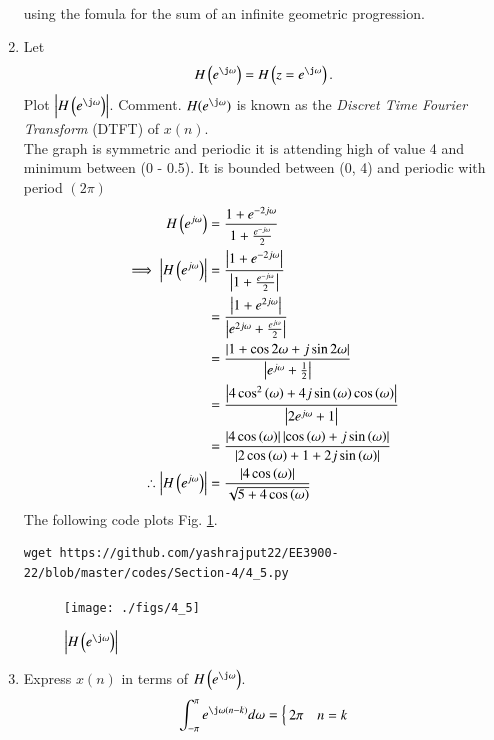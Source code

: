 \begin{enumerate}[label=\thesection.\arabic*]
\begin{align}
\end{align}
using the fomula for the sum of an infinite geometric progression.
%
\item 
Let
\begin{equation}
H\brak{e^{\j \omega}} = H\brak{z = e^{\j \omega}}.
\end{equation}
Plot $\abs{H\brak{e^{\j \omega}}}$.  Comment.  $H(e^{\j \omega})$ is
known as the {\em Discret Time Fourier Transform} (DTFT) of $x(n)$.
\\
\solution  The graph is symmetric and periodic it is attending high of value 4 and minimum between (0 - 0.5). 
It is bounded between (0, 4) and periodic with period $(2\pi)$
\\
\begin{align}
	H\left(e^{j \omega}\right) &= \frac{1+e^{-2j\omega}}{1 + \frac{e^{-j\omega}}{2}}\\
	  \implies \left\vert H\left(e^{j \omega}\right)\right\vert &= \frac{\left\vert1+e^{-2j\omega}\right\vert}{\left\vert1 + \frac{e^{-j\omega}}{2}\right\vert}\\
						  &= \frac{\left\vert1+e^{2j\omega}\right\vert}{\left\vert e^{2j\omega} + \frac{e^{j\omega}}{2}\right\vert}\\
						  &= \frac{\left\vert1+\cos2\omega + j\sin2\omega\right\vert}{\left\vert e^{j\omega}+ \frac{1}{2}\right\vert}\\
						  &= \frac{\left\vert4\cos^2\left(\omega\right) + 4j\sin\left(\omega\right)\cos\left(\omega\right)\right\vert}{\left\vert2e^{j\omega} + 1\right\vert}\\
						  &= \frac{\left\vert4\cos\left(\omega\right)\right\vert\left\vert\cos\left(\omega\right) + j\sin\left(\omega\right)\right\vert}{\left\vert2\cos\left(\omega\right) + 1 + 2j\sin\left(\omega\right)\right\vert}\\
	  \therefore \left\vert H\left(e^{j \omega}\right)\right\vert &= \frac{\left\vert4\cos\left(\omega\right)\right\vert}{\sqrt{5 +4\cos\left(\omega\right)}}
  \end{align}
The following code plots Fig. \ref{fig:dtft}.
\begin{lstlisting}
wget https://github.com/yashrajput22/EE3900-22/blob/master/codes/Section-4/4_5.py
\end{lstlisting}
\begin{figure}[!ht]
\centering
\texttt{[image: ./figs/4\_5]}
\caption{$\abs{H\brak{e^{\j\omega}}}$}
\label{fig:dtft}
\end{figure}
\item Express $x(n)$ in terms of $H\brak{e^{\j \omega}}$.\\
\solution 
\begin{align}
	\int_{-\pi}^{\pi}e^{\j\omega(n - k)}d\omega =
	\begin{cases}
		2\pi & n = k \\

\end{cases}
\end{align}
\end{enumerate}
